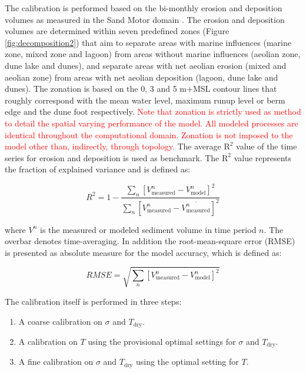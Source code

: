 The calibration is performed based on the bi-monthly erosion and
deposition volumes as measured in the Sand Motor domain
\citep{Hoonhout2017a}. The erosion and deposition volumes are
determined within seven predefined zones (Figure
\ref{fig:decomposition2}) that aim to separate areas with marine
influences (marine zone, mixed zone and lagoon) from areas without
marine influences (aeolian zone, dune lake and dunes), and separate
areas with net aeolian erosion (mixed and aeolian zone) from areas
with net aeolian deposition (lagoon, dune lake and dunes). The
zonation is based on the 0, 3 and 5 m+MSL contour lines that roughly
correspond with the mean water level, maximum runup level or berm edge
and the dune foot respectively. \textcolor{red}{Note that zonation is
  strictly used as method to detail the spatial varying performance of
  the model. All modeled processes are identical throughout the
  computational domain. Zonation is not imposed to the model other
  than, indirectly, through topology.} The average $\mathrm{R^2}$
value of the time series for erosion and deposition is used as
benchmark. The $\mathrm{R^2}$ value represents the fraction of
explained variance and is defined as:

\begin{equation}
  \label{eq:r2}
  R^2 = 1 - \frac{\sum_n \left[ V^n_{\mathrm{measured}} - V^n_{\mathrm{model}} \right]^2}{\sum_n \left[ V^n_{\mathrm{measured}} - \overline{V^n_{\mathrm{measured}}} \right]^2}
\end{equation}

\noindent where $V^n$ is the measured or modeled sediment volume in
time period $n$. The overbar denotes time-averaging. In addition the
root-mean-square error (RMSE) is presented as absolute measure for the
model accuracy, which is defined as:

\begin{equation}
  \label{eq:rmse}
  RMSE = \sqrt{\sum_n \left[ V^n_{\mathrm{measured}} - V^n_{\mathrm{model}} \right]^2}
\end{equation}

\noindent The calibration itself is performed in three steps:

\begin{enumerate}
\item A coarse calibration on $\sigma$ and $T_{\mathrm{dry}}$.
\item A calibration on $T$ using the provisional optimal settings for
  $\sigma$ and $T_{\mathrm{dry}}$.
\item A fine calibration on $\sigma$ and $T_{\mathrm{dry}}$ using the
  optimal setting for $T$.
\end{enumerate}

